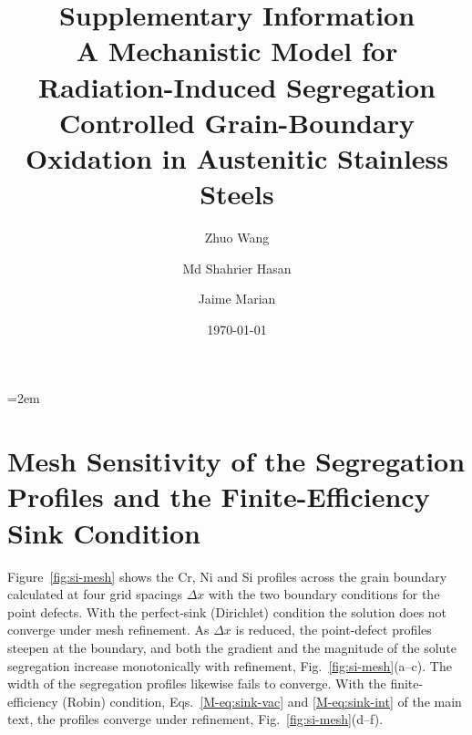 \documentclass[12pt]{article}
\title{Supplementary Information\\[0.5em]
\large A Mechanistic Model for Radiation-Induced Segregation Controlled
Grain-Boundary Oxidation in Austenitic Stainless Steels}
\author{Zhuo Wang \and Md Shahrier Hasan \and Jaime Marian}
\date{\today}
\begin{document}
\emergencystretch=2em
\maketitle

\section{Mesh Sensitivity of the Segregation Profiles and the Finite-Efficiency Sink Condition}
\label{sec:si-sink}

Figure~\ref{fig:si-mesh} shows the Cr, Ni and Si profiles across the grain
boundary calculated at four grid spacings \(\Delta x\) with the two boundary
conditions for the point defects. With the perfect-sink (Dirichlet) condition
the solution does not converge under mesh refinement. As \(\Delta x\) is
reduced, the point-defect profiles steepen at the boundary, and both the
gradient and the magnitude of the solute segregation increase monotonically
with refinement, Fig.~\ref{fig:si-mesh}(a--c). The width of the segregation
profiles likewise fails to converge. With the finite-efficiency (Robin)
condition, Eqs.~\eqref{M-eq:sink-vac} and \eqref{M-eq:sink-int} of the main
text, the profiles converge under refinement, Fig.~\ref{fig:si-mesh}(d--f).
\end{document}
